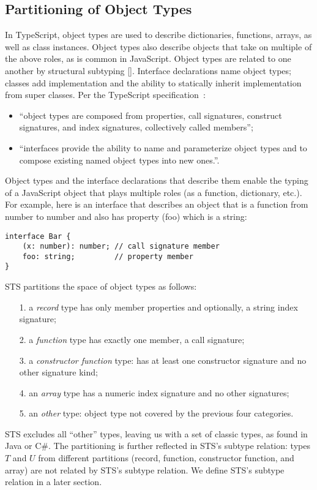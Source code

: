 \subsection{Partitioning of Object Types}

In TypeScript, object types are used to describe dictionaries, functions, arrays, as well as class instances. Object 
types also describe objects that take on multiple of the above roles, as is common in JavaScript. Object types are
related to one another by structural subtyping [].  Interface declarations name object types; classes add implementation
and the ability to statically inherit implementation from super classes. Per the TypeScript specification~\cite{XYZ}:
\begin{itemize}
\item ``object types are composed from properties, call signatures, construct signatures, and index signatures, collectively called members'';
\item ``interfaces provide the ability to name and parameterize object types and to compose existing named object types into new ones.''.
\end{itemize} 
Object types and the interface declarations that describe them enable the typing of a JavaScript object that plays multiple roles
(as a function, dictionary, etc.). For example, here is an interface that describes an object that is a function from number to number
and also has property (foo) which is a string:
\begin{lstlisting}
interface Bar {
    (x: number): number; // call signature member
    foo: string;         // property member
}
\end{lstlisting}
STS partitions the space of object types as follows:
\begin{itemize}
\item[1.] a \emph{record} type has only member properties and optionally, a string index signature;
\item[2.] a \emph{function} type has exactly one member, a call signature;
\item[3.] a \emph{constructor function} type: has at least one constructor signature and no other signature kind;
\item[4.] an \emph{array} type has a numeric index signature and no other signatures;
\item[5.] an \emph{other} type: object type not covered by the previous four categories.
\end{itemize}
STS excludes all ``other'' types, leaving us with a set of classic types, as found in Java or C\#.
The partitioning is further reflected in STS's subtype relation: 
types $T$ and $U$ from different partitions (record, function, constructor function, and array) 
are not related by STS's subtype relation.  We define STS's subtype relation in a later section.

